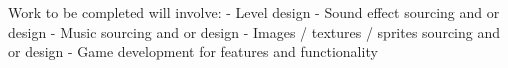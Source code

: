 Work to be completed will involve:
\newline\indent - Level design
\newline\indent - Sound effect sourcing and or design
\newline\indent - Music sourcing and or design
\newline\indent - Images / textures / sprites sourcing and or design
\newline\indent - Game development for features and functionality

